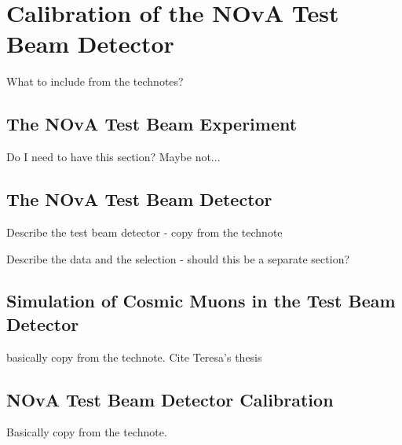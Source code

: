 \chapter{Calibration of the NOvA Test Beam Detector}\label{sec:TestBeamCalibration}

What to include from the technotes?

\section{The NOvA Test Beam Experiment}

Do I need to have this section? Maybe not...

\section{The NOvA Test Beam Detector}
Describe the test beam detector - copy from the technote

Describe the data and the selection - should this be a separate section?

\iffalse
\begin{figure}[hbtp]
\centering
\texttt{[image: Plots/RemoveTBSpills.pdf]}
\caption{Test Beam beam spill events removed from the calibration samples. Test Beam beam spill is 4.2 seconds long and we remove events (in blue) within a 5 seconds window from the start of the beam spill. The remaining events (green) should mostly consist of cosmic particles. This example and the numbers of entries are for the full period 4 Test Beam sample.}
\label{figRemoveBeamSpill}
\end{figure}
\fi

\section{Simulation of Cosmic Muons in the Test Beam Detector}
basically copy from the technote. Cite Teresa's thesis

\section{NOvA Test Beam Detector Calibration}
Basically copy from the technote.